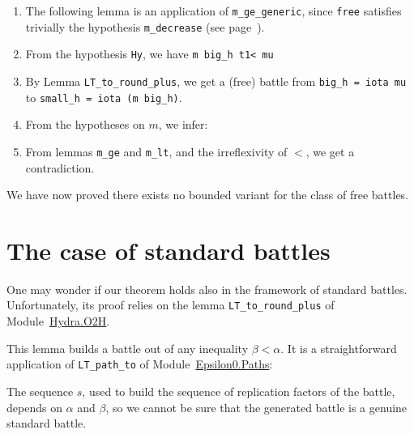 \begin{enumerate}
\item The following lemma is an application of \texttt{m\_ge\_generic}, since \texttt{free}
satisfies trivially the hypothesis \texttt{m\_decrease} (see page~\pageref{remark:m-decrease}).



\item From the hypothesis \texttt{Hy}, we have \texttt{m big\_h t1< mu}
\item By Lemma \texttt{LT\_to\_round\_plus}, we get a (free) battle from
\texttt{big\_h = iota mu} to \texttt{small\_h = iota (m big\_h)}.




\item From the hypotheses on $m$, we infer:


\item From lemmas \texttt{m\_ge} and \texttt{m\_lt}, and the irreflexivity of $<$, we get a contradiction. 


\end{enumerate}

We have now proved there exists no bounded variant for the class of free battles.




\section{The case of standard battles}
\label{sec:standard-intro}\label{std-case}
One may wonder if our theorem holds also in the framework of standard battles. Unfortunately, its proof relies on the lemma \texttt{LT\_to\_round\_plus} of
Module~\href{../theories/html/hydras.Hydra.O2H.html}{Hydra.O2H}.



This lemma builds a battle out of any inequality $\beta<\alpha$. 
It is a straightforward application of \texttt{LT\_path\_to} of
Module~\href{../theories/html/hydras.Epsilon0.Paths.html}{Epsilon0.Paths}:



The sequence $s$, used to build the sequence of replication factors of the battle, depends on 
$\alpha$ and $\beta$, so we cannot be sure that the generated battle is a genuine standard battle.


